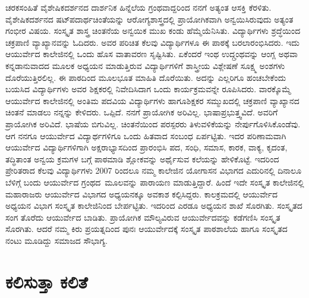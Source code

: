 {ಚರಕಸಂಹಿತೆ ವೈಶೇಷಿಕದರ್ಶನದ ದಾರ್ಶನಿಕ ಹಿನ್ನೆಲೆಯ ಗ್ರಂಥವಾದ್ದರಿಂದ ನನಗೆ ಅತ್ಯಂತ ಆಸಕ್ತಿ ಕೆರಳಿತು. ವೈಶೇಷಿಕದರ್ಶನದ ಷಟ್‍ಪದಾರ್ಥಚಿಂತೆಯನ್ನು ಆರೋಗ್ಯ\-ಶಾಸ್ತ್ರದಲ್ಲಿ ಪ್ರಾಯೋಗಿಕವಾಗಿ ಅನ್ವಯಿಸಿರುವುದು ಅತ್ಯಂತ ಗಂಭೀರ ವಿಷಯ.  ಸಂಸ್ಕೃತ ಶಾಸ್ತ್ರ ಚಿಂತನೆಯ ಅನ್ವಯಿಕ ಮುಖ ಕಂಡು ಹೆಮ್ಮೆಯೆನಿಸಿತು. ವಿದ್ಯಾರ್ಥಿಗಳು ಶ್ರದ್ಧೆಯಿಂದ ಚಕ್ರಪಾಣಿ ವ್ಯಾಖ್ಯಾನವನ್ನು ಓದಿದರು.  ಅವರ ಪರಿಚಿತ ಕೆಲವು ವಿದ್ಯಾರ್ಥಿಗಳೂ ಈ ಪಾಠಕ್ಕೆ ಬರಲಾರಂಭಿಸಿದರು.  ಇದು ಆಯುರ್ವೇದ ಕಾಲೇಜಿನಲ್ಲಿ ಒಂದು ಹೊಸ ವಾತಾವರಣ ಸೃಷ್ಟಿಸಿತು.  ಏಕೆಂದರೆ ಇಂಥ ಉದ್ಗ್ರಂಥವನ್ನು  ಆಂಗ್ಲ ಅಥವಾ ಕನ್ನಡಾನು\-ವಾದದ ಮೂಲಕ ಅಧ್ಯಯನ ಮಾಡುತ್ತಿರುವ ವಿದ್ಯಾರ್ಥಿಗಳಿಗೆ ಶಾಸ್ತ್ರೀಯ ವಿಶ್ಲೇಷಣೆ ಸೂಕ್ಷ್ಮ ಅಂಶಗಳು ದೊರೆಯುತ್ತಿರಲಿಲ್ಲ.  ಈ ಪಾಠದಿಂದ ಮೂಲಭೂತ ಮಾಹಿತಿ ದೊರೆಯಿತು.  ಅದನ್ನು ಎಲ್ಲರಿಗೂ ಹಂಚಬೇಕೆಂದು ಬಯಸಿದ ವಿದ್ಯಾರ್ಥಿಗಳು ಅವರ ಶಿಕ್ಷಕರಲ್ಲಿ ನಿವೇದಿಸಿದಾಗ ಒಂದು ಕಾರ್ಯಕ್ರಮವನ್ನೇ ರೂಪಿಸಿದರು.  ವಾರಕ್ಕೊಮ್ಮೆ ಆಯುರ್ವೇದ ಕಾಲೇಜಿನಲ್ಲಿ ಅಂತಿಮ ಪದವಿಯ ವಿದ್ಯಾರ್ಥಿಗಳು ಹಾಗೂ\break ಶಿಕ್ಷಕರ ಸಮ್ಮುಖದಲ್ಲಿ ಚಕ್ರಪಾಣಿ ವ್ಯಾಖ್ಯಾನದ ಚಿಂತನೆ ಮಾಡಲು ನನ್ನನ್ನು ಕೇಳಿದರು.  ಒಪ್ಪಿದೆ.  ನನಗೆ ಪ್ರಾಯೋಗಿಕ ಅರಿವಿಲ್ಲ.  ಭಾಷಾಪ್ರಭುತ್ತ್ವವಿದೆ. ಅವರಿಗೆ ಪ್ರಾಯೋಗಿಕ ಅರಿವಿದೆ. ಭಾಷೆಯ ಬಿಗುವಿಲ್ಲ.  ಚಿಂತನೆಯಿಂದ ಪರಸ್ಪರರು ತಿಳುವಳಿಕೆಯನ್ನು ನೇರ್ಪುಗೊಳಿಸಿಕೊಂಡೆವು.  ಆಗ ನನಗೂ ಆಯುರ್ವೇದ ವಿದ್ಯಾರ್ಥಗಳಿಗೂ ಒಂದು ಹಿತವಾದ ಸಂಬಂಧ ಏರ್ಪಟ್ಟಿತು.  ಇದರ ಪರಿಣಾಮವಾಗಿ ಆಯುರ್ವೇದ ವಿದ್ಯಾರ್ಥಿಗಳಿಗಾಗಿ ಅಕ್ಷರಾಭ್ಯಾಸದಿಂದ ಪ್ರಾರಂಭಿಸಿ ಪದ, ಸಂಧಿ, ಸಮಾಸ, ಕಾರಕ, ವಾಕ್ಯ, ಕೃದಂತ, ತದ್ಧಿತಾಂತ ಅನ್ವಯ ಕ್ರಮಗಳ ಬಗ್ಗೆ ಪಾಠಮಾಡಿ ಶ್ಲೋಕವನ್ನು ಅರ್ಥೈಸುವ ಕಲೆಯನ್ನು ಹೇಳಿಕೊಟ್ಟೆ.  ಇದರಿಂದ ಪ್ರೇರಿತರಾದ ಕೆಲವು ವಿದ್ಯಾರ್ಥಿಗಳು 2007 ರಿಂದಲೂ ನಮ್ಮ ಕಾಲೇಜಿನ ಯೋಗಾಸನ ವಿಭಾಗದ ಎದುರಿನಲ್ಲಿ ದಿನಾಲೂ ಬೆಳಿಗ್ಗೆ ಬಂದು ಆಯುರ್ವೇದ ಗ್ರಂಥದ\ ಮೂಲವನ್ನು ಪಾರಾಯಣ ಮಾಡುತ್ತಿದ್ದಾರೆ.  ಹಿಂದೆ ಇದೇ ಸಂಸ್ಕೃತ ಕಾಲೇಜಿನಲ್ಲಿ ಮಹಾರಾಜರು ಆಯುರ್ವೇದ ವಿಭಾಗದ ಅಧ್ಯಯನಕ್ಕೂ ಅವಕಾಶ ಕಲ್ಪಿಸಿದ್ದರು.  ಕಾಲಕ್ರಮದಲ್ಲಿ ಆಯುರ್ವೇದ ಅಧ್ಯಯನ ವಿಭಾಗ ಸಂಸ್ಕೃತ ಕಾಲೇಜಿನಿಂದ ಬೇರ್ಪಟ್ಟಿತು.  ಇದರಿಂದ ಎರಡೂ ಅಧ್ಯಯನ ಶಾಖೆ ಸೊರಗಿತು.  ಸಂಸ್ಕೃತದ ಸಂಗ ತೊರೆದು ಆಯುರ್ವೇದ ಬಾಡಿತು.  ಪ್ರಾಯೋಗಿಕ  ಮೌಲ್ಯವಿರುವ  ಆಯುರ್ವೇದವನ್ನು ಕಡೆ\-ಗಣಿಸಿ ಸಂಸ್ಕೃತ ಸೊರಗಿತು.  ಆದರೆ ನಮ್ಮ ಕಿರು ಪ್ರಯತ್ನದಿಂದ ಪುನಃ ಆಯುರ್ವೇದಕ್ಕೆ ಸಂಸ್ಕೃತ ಪಾಠಶಾಲೆಯ ಹಾಗೂ ಸಂಸ್ಕೃತದ ನಂಟು ಮೂಡಿದ್ದು ಸಮಾಜದ ಸೌಭಾಗ್ಯ.   

\section*{ಕಲಿಸುತ್ತಾ ಕಲಿತೆ}

}
